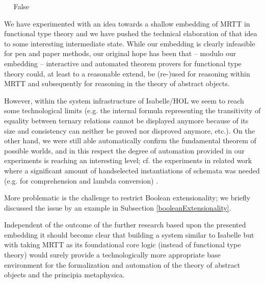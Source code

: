 \begin{isabellebody}
%
\endisadelimproof
\isanewline
\ \isamarkupfalse%
\ False\ \isamarkupfalse%
%
\isadelimproof
\ %
\endisadelimproof
%
\isatagproof
{}\isamarkupfalse%
%
\endisatagproof
{\isafoldproof}%
%
\isadelimproof
%
\endisadelimproof
%
\isamarkuptrue%
%
\begin{isamarkuptext}%
We have experimented with an idea towards a shallow embedding of MRTT in 
  functional type theory 
  and we have pushed the technical 
  elaboration of that idea to some interesting intermediate state.   
  While our embedding is clearly infeasible for pen and paper methods, 
  our original hope has been that -- modulo our embedding -- interactive and automated theorem provers for 
  functional type theory could, at least to a reasonable extend, be (re-)used for reasoning within
  MRTT and subsequently for reasoning in the theory of abstract objects. 


  However, within the system infrastructure of Isabelle/HOL we seem to reach some technological limits (e.g. the 
internal formula representing the transitivity of equality between ternary relations cannot be displayed anymore 
 because of its size and consistency can neither be proved nor disproved anymore, etc.).
 On the other hand, we were still able automatically confirm the 
 fundamental theorem of possible worlds, and in this respect the degree of automation provided in our
 experiments is reaching an interesting level; cf. the experiments in related work where 
 a significant amount of handselected instantiations of schemata was needed (e.g. for comprehension and lambda
 conversion) \cite{FitelsonZ07,Zalta15}.

 More problematic is the challenge to restrict Boolean extensionality; we briefly discussed the issue by an example 
 in Subsection \ref{booleanExtensionality}. 

 Independent of the outcome of the further research based upon the presented embedding it should 
 become clear that building a system similar to Isabelle but with taking MRTT as its foundational 
 core logic (instead of functional type theory) would surely provide
 a technologically more appropriate base environment for the formalization and automation of the 
 theory of abstract objects and the principia metaphysica.%
\end{isamarkuptext}\isamarkuptrue%
%
\isadelimtheory
%
\endisadelimtheory
%
\isatagtheory
%
\endisatagtheory
{\isafoldtheory}%
%
\isadelimtheory
%
\endisadelimtheory
%
\end{isabellebody}%
